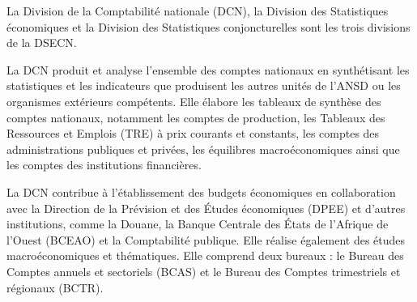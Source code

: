 \documentclass[12pt,a4paper]{report}
\begin{document}
La Division de la Comptabilité nationale (DCN), la Division des Statistiques économiques et la Division des Statistiques conjoncturelles sont les trois divisions de la DSECN.

La DCN produit et analyse l'ensemble des comptes nationaux en synthétisant les statistiques et les indicateurs que produisent les autres unités de l'ANSD ou les organismes extérieurs compétents. Elle élabore les tableaux de synthèse des comptes nationaux, notamment les comptes de production, les Tableaux des Ressources et Emplois (TRE) à prix courants et constants, les comptes des administrations publiques et privées, les équilibres macroéconomiques ainsi que les comptes des institutions financières.

La DCN contribue à l'établissement des budgets économiques en collaboration avec la Direction de la Prévision et des Études économiques (DPEE) et d'autres institutions, comme la Douane, la Banque Centrale des États de l'Afrique de l'Ouest (BCEAO) et la Comptabilité publique. Elle réalise également des études macroéconomiques et thématiques. Elle comprend deux bureaux : le Bureau des Comptes annuels et sectoriels (BCAS) et le Bureau des Comptes trimestriels et régionaux (BCTR).
\end{document}
